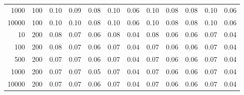 \begin{table}[ht]
\begin{tabular}{rrrrrrrrrrrr}
  1000 & 100 & 0.10 & 0.09 & 0.08 & 0.10 & 0.06 & 0.10 & 0.08 & 0.08 & 0.10 & 0.06 \\ 
  10000 & 100 & 0.10 & 0.10 & 0.08 & 0.10 & 0.06 & 0.10 & 0.08 & 0.08 & 0.10 & 0.06 \\ 
  10 & 200 & 0.08 & 0.07 & 0.06 & 0.08 & 0.04 & 0.08 & 0.06 & 0.06 & 0.07 & 0.04 \\ 
  100 & 200 & 0.08 & 0.07 & 0.06 & 0.07 & 0.04 & 0.07 & 0.06 & 0.06 & 0.07 & 0.04 \\ 
  500 & 200 & 0.07 & 0.07 & 0.06 & 0.07 & 0.04 & 0.07 & 0.06 & 0.06 & 0.07 & 0.04 \\ 
  1000 & 200 & 0.07 & 0.07 & 0.05 & 0.07 & 0.04 & 0.07 & 0.06 & 0.06 & 0.07 & 0.04 \\ 
  10000 & 200 & 0.07 & 0.07 & 0.06 & 0.07 & 0.04 & 0.07 & 0.06 & 0.06 & 0.07 & 0.04 \\ 
   \hline
\end{tabular}
\end{table}
